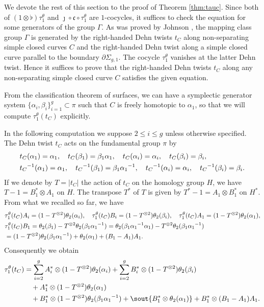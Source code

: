 \documentclass[a4paper,12pt, twoside]{amsart}
\theoremstyle{definition}
\theoremstyle{remark}
\numberwithin{equation}{section}
\newcommand\inv{^{-1}}
\newcommand\pa{\partial}
\newcommand\Sgone{\Sigma_{g,1}}
\begin{document}
\medskip
We devote the rest of this section to the proof of Theorem \ref{thm:tauc}. 
Since both of $(1\otimes \flat)\tau^\theta_1$ and $\jmath\circ\mathfrak{c}\circ \tau^\theta_1$ are $1$-cocycles, it suffices to check the equation for some generators of the group $\Gamma$. 
As was proved by Johnson \cite[Theorem 1, p.434]{J83}, 
the mapping class group $\Gamma$ is generated by the right-handed Dehn twists $t_C$ along non-separating simple closed curves $C$ and the right-handed Dehn twist along a simple closed curve parallel to the boundary $\pa\Sgone$. 
The cocycle $\tau^\theta_1$ vanishes at the latter Dehn twist. 
Hence it suffices to prove that the right-handed Dehn twists $t_C$ along any non-separating simple closed curve $C$ satisfies the given equation. \par
From the classification theorem of surfaces, we can have a symplectic generator system $\{\alpha_i, \beta_i\}^g_{i=1} \subset \pi$ such that $C$ is freely homotopic to $\alpha_1$, so that we will compute $\tau^\theta_1(t_C)$ explicitly.\par
\medskip
In the following computation we suppose $2 \leq i \leq g$ unless otherwise specified. The Dehn twist $t_C$ acts on the fundamental group $\pi$ by
$$
\aligned
&t_C(\alpha_1) = \alpha_1, \quad
t_C(\beta_1) = \beta_1\alpha_1, \quad
t_C(\alpha_i) = \alpha_i, \quad
t_C(\beta_i) = \beta_i,\\
& {t_C}\inv(\alpha_1) = \alpha_1, \quad
{t_C}\inv(\beta_1) = \beta_1{\alpha_1}\inv, \quad
{t_C}\inv(\alpha_i) = \alpha_i, \quad
{t_C}\inv(\beta_i) = \beta_i.
\endaligned
$$
If we denote by $T = |t_C|$ the action of $t_C$ on the homology group $H$, 
we have $T-1 = B^*_1\otimes A_1$ on $H$.
The transpose $T^*$ of $T$ is given by
$T^*-1= A_1\otimes B^*_1$ on $H^*$.
From what we recalled so far, we have 
$$
\aligned
&\tau^\theta_1(t_C)A_i = (1 - T^{\otimes 2})\theta_2(\alpha_i), \quad
\tau^\theta_1(t_C)B_i = (1 - T^{\otimes 2})\theta_2(\beta_i), \quad
\tau^\theta_1(t_C)A_1 = (1 - T^{\otimes 2})\theta_2(\alpha_1), \\
&\tau^\theta_1(t_C)B_1 
= \theta_2(\beta_1) - T^{\otimes 2}\theta_2(\beta_1{\alpha_1}\inv)
= \theta_2(\beta_1{\alpha_1}\inv\alpha_1) - T^{\otimes 2}\theta_2(\beta_1{\alpha_1}\inv)\\
& = (1 - T^{\otimes 2})\theta_2(\beta_1{\alpha_1}\inv) + \theta_2(\alpha_1) + 
(B_1-A_1)A_1.
\endaligned
$$
Consequently we obtain
\begin{equation}\label{eq:tau1tC}
\aligned
\tau^\theta_1(t_C) &= 
\sum^g_{i=2}A^*_i\otimes  (1 - T^{\otimes 2})\theta_2(\alpha_i)
+ \sum^g_{i=2}B^*_i\otimes  (1 - T^{\otimes 2})\theta_2(\beta_i)\\
&\quad + A^*_1\otimes (1-T^{\otimes 2})\theta_2(\alpha_1)\\
&\quad + B^*_1\otimes (1-T^{\otimes 2})\theta_2(\beta_1{\alpha_1}\inv)
+  \sout{B^*_1\otimes \theta_2(\alpha_1)} + B^*_1\otimes (B_1-A_1)A_1.
\endaligned
\end{equation}
\end{document}
